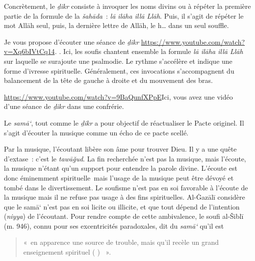 Concrètement, le \emph{ḏikr} consiste à invoquer les noms divins ou à
répéter la première partie de la formule de la \emph{šahāda}~: \emph{lā
ilāha illā Llāh}. Puis, il s'agit de répéter le mot Allāh seul, puis, la
dernière lettre de Allāh, le h\ldots{} dans un seul souffle.

Je vous propose d'écouter {une séance de
\emph{ḏikr}
\url{https://www.youtube.com/watch?v=Xq6bIVtCq14}}\emph{.} 
. Ici, les soufis chantent
ensemble la formule \emph{lā ilāha illā Llāh} sur laquelle se surajoute
une psalmodie. Le rythme s'accélère et indique une forme d'ivresse
spirituelle. Généralement, ces invocations s'accompagnent du balancement
de la tête de gauche à droite et du mouvement des bras.

\url{https://www.youtube.com/watch?v=9BaQunfXPpE}{Ici}, vous avez une
vidéo d'une séance de \emph{ḏikr} dans une confrérie.


\begin{Def}[{samā`}]
Le \emph{samā`}, tout comme le \emph{ḏikr} a pour objectif de
réactualiser le Pacte originel. Il s'agit d'écouter la musique comme un
écho de ce pacte scellé. 
\end{Def}
Par la musique, l'écoutant libère son âme pour
trouver Dieu. Il y a une quête d'extase~: c'est le \emph{tawāǧud}. La
fin recherchée n'est pas la musique, mais l'écoute, la musique n'étant
qu'un support pour entendre la parole divine. L'écoute est donc
éminemment spirituelle~mais l'usage de la musique peut être dévoyé et
tombé dans le divertissement. Le soufisme n'est pas en soi favorable à
l'écoute de la musique mais il ne refuse pas usage à des fins
spirituelles. Al-Ġazālī  \label{theol:AlGazali28} considère que le samā` n'est pas en soi licite
ou illicite, et que tout dépend de l'intention (\emph{niyya}) de
l'écoutant. Pour rendre compte de cette ambivalence, le soufi al-Šiblī
(m. 946), connu pour ses excentricités paradoxales, dit du \emph{samā`}
qu'il est 
\begin{quote}
    «~en apparence une source de trouble, mais qu'il recèle un
grand enseignement spirituel (
)
~».
\end{quote}

